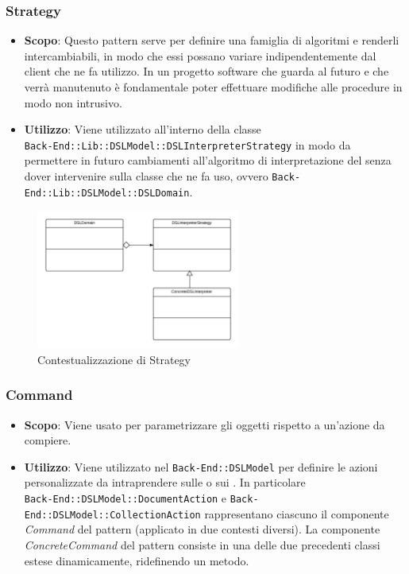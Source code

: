 \subsubsection{Strategy}

\begin{itemize}

	\item \textbf{Scopo}: Questo pattern serve per definire una famiglia di algoritmi e renderli intercambiabili, in modo che essi possano variare indipendentemente dal client che ne fa utilizzo. In un progetto software che guarda al futuro e che verrà manutenuto è fondamentale poter effettuare modifiche alle procedure in modo non intrusivo.
	\item \textbf{Utilizzo}: Viene utilizzato all'interno della classe \\ \texttt{Back-End::Lib::DSLModel::DSLInterpreterStrategy} in modo da permettere in futuro cambiamenti all'algoritmo di interpretazione del  senza dover intervenire sulla classe che ne fa uso, ovvero \texttt{Back-End::Lib::DSLModel::DSLDomain}.

\end{itemize}

\begin{figure}[H]
\centering \includegraphics[width=0.6\textwidth]{patterns/contestualizzazione/strategy.png}
\caption{Contestualizzazione di Strategy}
\label{fig:mvc}
\end{figure}

\subsubsection{Command}

\begin{itemize}

	\item \textbf{Scopo}: Viene usato per parametrizzare gli oggetti rispetto a un'azione da compiere.
	\item \textbf{Utilizzo}: Viene utilizzato nel  \texttt{Back-End::DSLModel} per definire le azioni personalizzate da intraprendere sulle  o sui . In particolare \\ \texttt{Back-End::DSLModel::DocumentAction} e \texttt{Back-End::DSLModel::CollectionAction} rappresentano ciascuno il componente \textit{Command} del pattern (applicato in due contesti diversi). La componente \textit{ConcreteCommand} del pattern consiste in una delle due precedenti classi estese dinamicamente, ridefinendo un metodo.

\end{itemize}